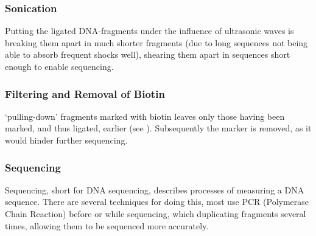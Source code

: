 \subsubsection{Sonication}\label{sec:sonication}

Putting the ligated DNA-fragments under the influence of ultrasonic waves is
breaking them apart in much shorter fragments (due to long sequences not being
able to absorb frequent shocks well), shearing them apart in sequences short
enough to enable sequencing.


\subsubsection{Filtering and Removal of Biotin}\label{sec:pulldown}

`pulling-down' fragments marked with biotin leaves only those having been
marked, and thus ligated, earlier (see ). Subsequently the
marker is removed, as it would hinder further sequencing.

\subsubsection{Sequencing}\label{sec:sequencing}

Sequencing, short for DNA sequencing, describes processes of measuring a DNA
sequence. There are several techniques for doing this, most use PCR (Polymerase
Chain Reaction) before or while sequencing, which duplicating fragments
several times, allowing them to be sequenced more accurately.







